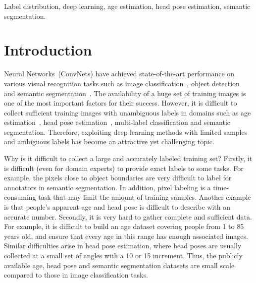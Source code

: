 \documentclass[journal]{IEEEtran}
\begin{document}
\begin{IEEEkeywords}
Label distribution, deep learning, age estimation, head pose estimation, semantic segmentation.
\end{IEEEkeywords}
\IEEEpeerreviewmaketitle

\section{Introduction}
 Neural Networks~(ConvNets) have achieved state-of-the-art performance on various visual recognition tasks such as image classification~\cite{krizhevsky2012imagenet}, object detection~\cite{girshick2014rich} and semantic segmentation~\cite{long2015fully}. The availability of a huge set of training images is one of the most important factors for their success. However, it is difficult to collect sufficient training images with unambiguous labels in domains such as age estimation~\cite{geng2013facial}, head pose estimation~\cite{kong2015head}, multi-label classification and semantic segmentation. Therefore, exploiting deep learning methods with limited samples and ambiguous labels has become an attractive yet challenging topic.

Why is it difficult to collect a large and accurately labeled training set? Firstly, it is difficult (even for domain experts) to provide exact labels to some tasks. For example, the pixels close to object boundaries are very difficult to label for annotators in semantic segmentation. In addition, pixel labeling is a time-consuming task that may limit the amount of training samples. Another example is that people's apparent age and head pose is difficult to describe with an accurate number. Secondly, it is very hard to gather complete and sufficient data. For example, it is difficult to build an age dataset covering people from 1 to 85 years old, and ensure that every age in this range has enough associated images. Similar difficulties arise in head pose estimation, where head poses are usually collected at a small set of angles with a 10 or 15 increment. Thus, the publicly available age, head pose and semantic segmentation datasets are small scale compared to those in image classification tasks.
\end{document}
